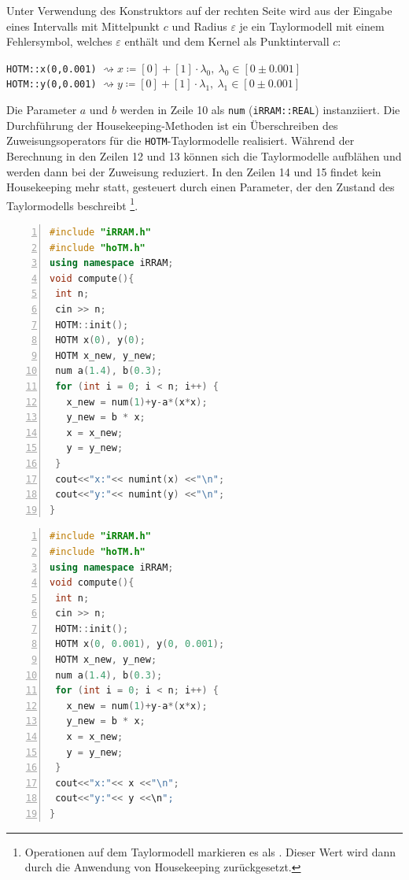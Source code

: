  
 Unter Verwendung des Konstruktors auf der rechten Seite wird aus der Eingabe eines Intervalls mit Mittelpunkt $c$ und Radius $\varepsilon$ je ein Taylormodell mit einem Fehlersymbol, welches $\varepsilon$ enthält und dem Kernel als Punktintervall $c$: 
 \begin{center}
  \verb+HOTM::x(0,0.001)+ $\rightsquigarrow x\coloneqq [0] + [1] \cdot \lambda_0,\ \lambda_0 \in [0 \pm 0.001]$\\
  \verb+HOTM::y(0,0.001)+ $\rightsquigarrow y\coloneqq[0] + [1] \cdot \lambda_1,\ \lambda_1 \in [0 \pm 0.001]$
 \end{center}

Die Parameter $a$ und $b$ werden in Zeile 10 als \verb+num+ (\verb+iRRAM::REAL+) instanziiert. Die Durchführung der Housekeeping-Methoden ist ein Überschreiben des Zuweisungsoperators \anf{=} für die \verb+HOTM+-Taylormodelle realisiert. Während der Berechnung in den Zeilen 12 und 13 können sich die Taylormodelle aufblähen und werden dann bei der Zuweisung reduziert. In den Zeilen 14 und 15 findet kein Housekeeping mehr statt, gesteuert durch einen Parameter, der den Zustand des Taylormodells beschreibt \footnote{Operationen auf dem Taylormodell markieren es als . Dieser Wert wird dann durch die Anwendung von Housekeeping zurückgesetzt.}.

 
 \begin{minipage}{.5\textwidth}
    \begin{lstlisting}[language=C++, caption={[Implementierung der H\e non-Iteration in HOTM mit Intervallen,] \\Implementierung mit Punktintervallen },captionpos=b,xleftmargin=15pt, numbers=left,stepnumber=1,basicstyle=\footnotesize, label=list:int]
#include "iRRAM.h"
#include "hoTM.h"
using namespace iRRAM;
void compute(){
 int n;
 cin >> n;
 HOTM::init();
 HOTM x(0), y(0);
 HOTM x_new, y_new;
 num a(1.4), b(0.3);
 for (int i = 0; i < n; i++) {
   x_new = num(1)+y-a*(x*x);
   y_new = b * x;
   x = x_new;
   y = y_new;
 }
 cout<<"x:"<< numint(x) <<"\n";
 cout<<"y:"<< numint(y) <<"\n";
}
\end{lstlisting}
 \end{minipage}
 \begin{minipage}{.5\textwidth}
    \begin{lstlisting}[language=C++, caption={[Implementierung der H\e non-Iteration in HOTM mit Intervallen] \\Implementierung mit Intervallen },captionpos=b,xleftmargin=15pt, numbers=left,stepnumber=1,basicstyle=\footnotesize,label=list:point]  
#include "iRRAM.h"
#include "hoTM.h"
using namespace iRRAM;
void compute(){
 int n;
 cin >> n;
 HOTM::init();
 HOTM x(0, 0.001), y(0, 0.001);
 HOTM x_new, y_new;
 num a(1.4), b(0.3);
 for (int i = 0; i < n; i++) {
   x_new = num(1)+y-a*(x*x);
   y_new = b * x;
   x = x_new;
   y = y_new;
 }
 cout<<"x:"<< x <<"\n";
 cout<<"y:"<< y <<\n";
}
\end{lstlisting}
 \end{minipage}

 
 

